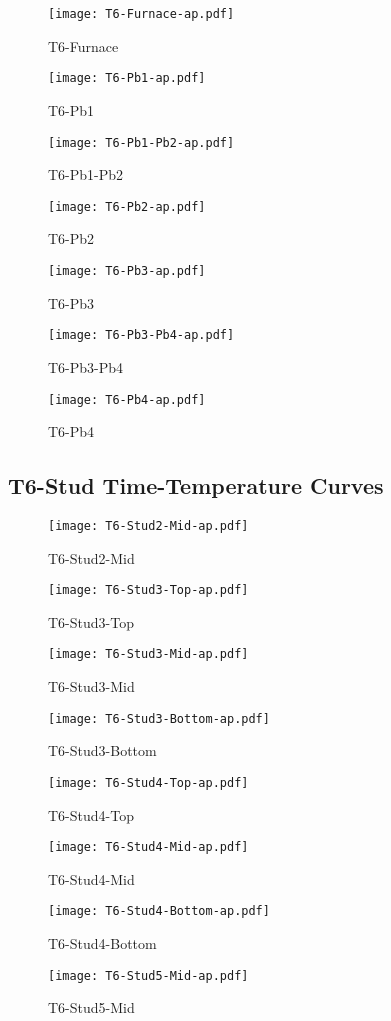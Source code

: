 \begin{figure}[htbp]
\centering
	\texttt{[image: T6-Furnace-ap.pdf]}
	\caption*{T6-Furnace}
\end{figure}
\begin{figure}[htbp]
	\centering
		\texttt{[image: T6-Pb1-ap.pdf]}
		\caption*{T6-Pb1}
\end{figure}
\begin{figure}[htbp]
	\centering
		\texttt{[image: T6-Pb1-Pb2-ap.pdf]}
		\caption*{T6-Pb1-Pb2}
\end{figure}
\begin{figure}[htbp]
	\centering
		\texttt{[image: T6-Pb2-ap.pdf]}
		\caption*{T6-Pb2}
\end{figure}
\begin{figure}[htbp]
	\centering
		\texttt{[image: T6-Pb3-ap.pdf]}
		\caption*{T6-Pb3}
\end{figure}
\begin{figure}[htbp]
	\centering
			\texttt{[image: T6-Pb3-Pb4-ap.pdf]}
			\caption*{T6-Pb3-Pb4}
\end{figure}
\begin{figure}[htbp]
	\centering
			\texttt{[image: T6-Pb4-ap.pdf]}
			\caption*{T6-Pb4}
\end{figure}

\pagebreak

\subsection*{T6-Stud Time-Temperature Curves}

\begin{figure}[htbp]
	\centering
			\texttt{[image: T6-Stud2-Mid-ap.pdf]}
			\caption*{T6-Stud2-Mid}
\end{figure}
\begin{figure}[htbp]
	\centering
			\texttt{[image: T6-Stud3-Top-ap.pdf]}
			\caption*{T6-Stud3-Top}
\end{figure}
\begin{figure}[htbp]
	\centering
			\texttt{[image: T6-Stud3-Mid-ap.pdf]}
			\caption*{T6-Stud3-Mid}
\end{figure}
\begin{figure}[htbp]
	\centering
			\texttt{[image: T6-Stud3-Bottom-ap.pdf]}
			\caption*{T6-Stud3-Bottom}
\end{figure}
\begin{figure}[htbp]
	\centering
			\texttt{[image: T6-Stud4-Top-ap.pdf]}
			\caption*{T6-Stud4-Top}
\end{figure}
\begin{figure}[htbp]
	\centering
			\texttt{[image: T6-Stud4-Mid-ap.pdf]}
			\caption*{T6-Stud4-Mid}
\end{figure}
\begin{figure}[htbp]
	\centering
			\texttt{[image: T6-Stud4-Bottom-ap.pdf]}
			\caption*{T6-Stud4-Bottom}
\end{figure}
\begin{figure}[htbp]
	\centering
			\texttt{[image: T6-Stud5-Mid-ap.pdf]}
			\caption*{T6-Stud5-Mid}
\end{figure}

